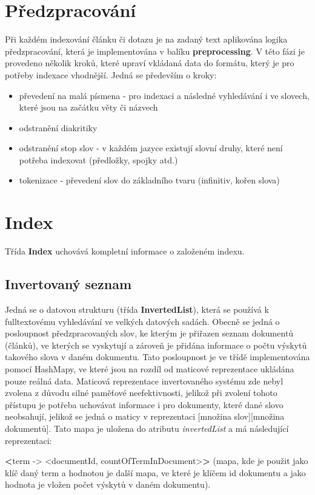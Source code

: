 \documentclass[
12pt,
a4paper,
pdftex,
czech,
titlepage
]{report}
\begin{document}
\section{Předzpracování}
Při každém indexování článku či dotazu je na zadaný text aplikována logika předzpracování, která je implementována v balíku \textbf{preprocessing}. V této fázi je provedeno několik kroků, které upraví vkládaná data do formátu, který je pro potřeby indexace vhodnější. Jedná se především o kroky:
\begin{itemize}
    \item převedení na malá písmena - pro indexaci a následné vyhledávání i ve slovech, které jsou na začátku věty či názvech
    \item odstranění diakritiky
    \item odstranění stop slov - v každém jazyce existují slovní druhy, které není potřeba indexovat (předložky, spojky atd.)
    \item tokenizace - převedení slov do základního tvaru (infinitiv, kořen slova)
\end{itemize}
\section{Index}
Třída \textbf{Index} uchovává kompletní informace o založeném indexu.
\subsection{Invertovaný seznam}
Jedná se o datovou strukturu (třída \textbf{InvertedList}), která se používá k fulltextovému vyhledávání ve velkých datových sadách. Obecně se jedná o posloupnost předzpracovaných slov, ke kterým je přiřazen seznam dokumentů (článků), ve kterých se vyskytují a zároveň je přidána informace o počtu výskytů takového slova v daném dokumentu. Tato posloupnost je ve třídě implementována pomocí HashMapy, ve které jsou na rozdíl od maticové reprezentace ukládána pouze reálná data. Maticová reprezentace invertovaného systému zde nebyl zvolena z důvodu silné paměťové neefektivnosti, jelikož při zvolení tohoto přístupu je potřeba uchovávat informace i pro dokumenty, které dané slovo neobsahují, jelikož se jedná o maticy v reprezentaci [množina slov][množina dokumentů]. Tato mapa je uložena do atributu \textit{invertedList} a má následující reprezentaci: 

\textbf{<}term -> <documentId, countOfTermInDocument>\textbf{>} (mapa, kde je použit jako klíč daný term a hodnotou je další mapa, ve které je klíčem id dokumentu a jako hodnota je vložen počet výskytů v daném dokumentu).
\end{document}
